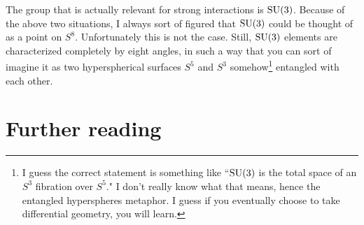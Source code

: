 The group that is actually relevant for strong interactions is $\operatorname{SU}(3)$. Because
of the above two situations, I always sort of figured that $\operatorname{SU}(3)$ could be
thought of as a point on $S^8$. Unfortunately this is not the case. Still,
$\operatorname{SU}(3)$ elements are characterized completely by eight angles, in such a way
that you can sort of imagine it as two hyperspherical surfaces $S^5$ and $S^3$
somehow\footnote{I guess the correct statement is something like ``$\operatorname{SU}(3)$
is the total space of an $S^3$ fibration over $S^5$." I don't really know what
that means, hence the entangled hyperspheres metaphor. I guess if you eventually
choose to take differential geometry, you will learn.} entangled with each other.



\section{Further reading}

